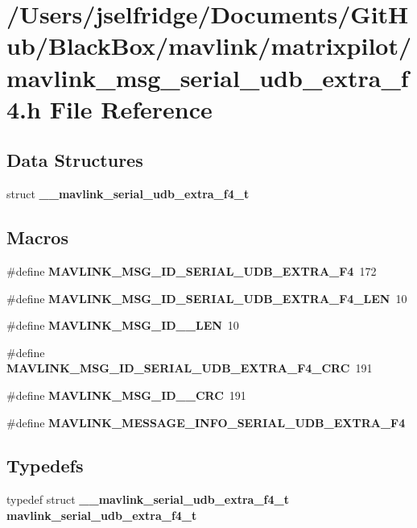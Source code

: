 \section{/\+Users/jselfridge/\+Documents/\+Git\+Hub/\+Black\+Box/mavlink/matrixpilot/mavlink\+\_\+msg\+\_\+serial\+\_\+udb\+\_\+extra\+\_\+f4.h File Reference}
\label{mavlink__msg__serial__udb__extra__f4_8h}
\subsection*{Data Structures}
\begin{DoxyCompactItemize}
\item 
struct \textbf{ \+\_\+\+\_\+mavlink\+\_\+serial\+\_\+udb\+\_\+extra\+\_\+f4\+\_\+t}
\end{DoxyCompactItemize}
\subsection*{Macros}
\begin{DoxyCompactItemize}
\item 
\#define \textbf{ M\+A\+V\+L\+I\+N\+K\+\_\+\+M\+S\+G\+\_\+\+I\+D\+\_\+\+S\+E\+R\+I\+A\+L\+\_\+\+U\+D\+B\+\_\+\+E\+X\+T\+R\+A\+\_\+\+F4}~172
\item 
\#define \textbf{ M\+A\+V\+L\+I\+N\+K\+\_\+\+M\+S\+G\+\_\+\+I\+D\+\_\+\+S\+E\+R\+I\+A\+L\+\_\+\+U\+D\+B\+\_\+\+E\+X\+T\+R\+A\+\_\+\+F4\+\_\+\+L\+EN}~10
\item 
\#define \textbf{ M\+A\+V\+L\+I\+N\+K\+\_\+\+M\+S\+G\+\_\+\+I\+D\+\_\+\_\+\+L\+EN}~10
\item 
\#define \textbf{ M\+A\+V\+L\+I\+N\+K\+\_\+\+M\+S\+G\+\_\+\+I\+D\+\_\+\+S\+E\+R\+I\+A\+L\+\_\+\+U\+D\+B\+\_\+\+E\+X\+T\+R\+A\+\_\+\+F4\+\_\+\+C\+RC}~191
\item 
\#define \textbf{ M\+A\+V\+L\+I\+N\+K\+\_\+\+M\+S\+G\+\_\+\+I\+D\+\_\+\_\+\+C\+RC}~191
\item 
\#define \textbf{ M\+A\+V\+L\+I\+N\+K\+\_\+\+M\+E\+S\+S\+A\+G\+E\+\_\+\+I\+N\+F\+O\+\_\+\+S\+E\+R\+I\+A\+L\+\_\+\+U\+D\+B\+\_\+\+E\+X\+T\+R\+A\+\_\+\+F4}
\end{DoxyCompactItemize}
\subsection*{Typedefs}
\begin{DoxyCompactItemize}
\item 
typedef struct \textbf{ \+\_\+\+\_\+mavlink\+\_\+serial\+\_\+udb\+\_\+extra\+\_\+f4\+\_\+t} \textbf{ mavlink\+\_\+serial\+\_\+udb\+\_\+extra\+\_\+f4\+\_\+t}
\end{DoxyCompactItemize}


